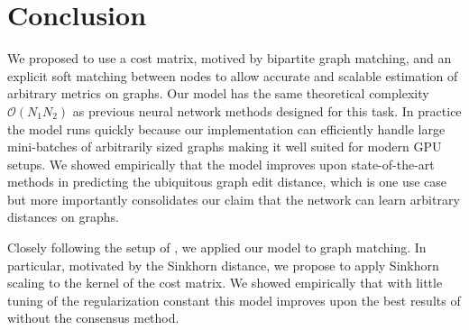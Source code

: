 \section{Conclusion}


We proposed to use a cost matrix, motived by bipartite graph matching, and an explicit soft matching between nodes to allow accurate and scalable estimation of arbitrary metrics on graphs. Our model has the same theoretical complexity $\mathcal{O}(N_1 N_2)$ as previous neural network methods designed for this task. In practice the model runs quickly because our implementation can efficiently handle large mini-batches of arbitrarily sized graphs making it well suited for modern GPU setups. We showed empirically that the model improves upon state-of-the-art methods in predicting the ubiquitous graph edit distance, which is one use case but more importantly consolidates our claim that the network can learn arbitrary distances on graphs.



Closely following the setup of \cite{fey2020_update}, we applied our  model to graph matching. In particular, motivated by the Sinkhorn distance, we propose to apply Sinkhorn scaling to the kernel of the cost matrix. We showed empirically that with little tuning of the regularization constant this model improves upon the best results of \cite{fey2020_update} without the consensus method.

